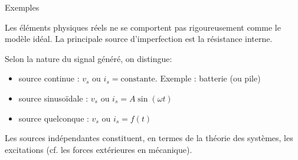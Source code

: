\begin{frame} {Exemples}

Les éléments physiques réels ne se comportent pas rigoureusement comme le modèle idéal.
La principale source d'imperfection est la \alert{résistance interne}.

Selon la nature du signal généré, on distingue:
\begin{itemize}
  \item source continue : $v_s$ ou $i_s=\text{constante}$.  Exemple : batterie (ou pile)
  \item source sinusoïdale : $v_s$ ou $i_s=A \sin (\omega t)$
  \item source quelconque : $v_s$ ou $i_s=f(t)$
\end{itemize}
  
Les sources indépendantes constituent, en termes de la théorie des systèmes, les \alert{excitations} (cf. les forces extérieures en mécanique).

\end{frame}


